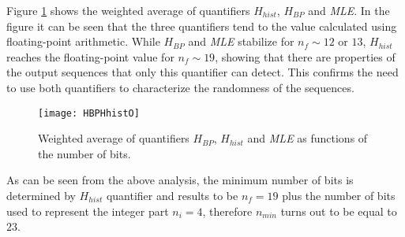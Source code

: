 Figure \ref{fig:HBPHhist} shows the weighted average of quantifiers $H_{hist}$, $H_{BP}$ and \textsl{MLE}.
In the figure it can be seen that the three quantifiers tend to the value calculated using floating-point arithmetic.
While $H_{BP}$ and \textsl{MLE} stabilize for $n_f \sim 12$ or $13$, $H_{hist}$ reaches the floating-point value for $n_f \sim 19$, showing that there are properties of the output sequences that only this quantifier can detect.
This confirms the need to use both quantifiers to characterize the randomness of the sequences.
%
\begin{figure}
    \centering
        \texttt{[image: HBPHhistO]}\\
    \caption{Weighted average of quantifiers $H_{BP}$,  $H_{hist}$ and \textsl{MLE} as functions of the number of bits.}\label{fig:HBPHhist}
\end{figure}

As can be seen from the above analysis, the minimum number of bits is determined by $H_{hist}$ quantifier and results to be $n_f=19$ plus the number of bits used to represent the integer part $n_i=4$, therefore $n_{min}$ turns out to be equal to $23$.